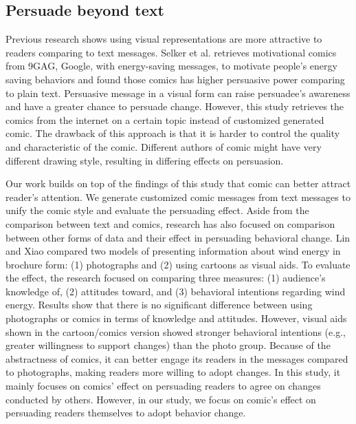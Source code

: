 \subsection{Persuade beyond text}
Previous research shows using visual representations are more attractive to readers comparing to text messages. Selker et al. retrieves motivational comics from 9GAG, Google, with energy-saving messages, to motivate people’s energy saving behaviors and found those comics has higher persuasive power comparing to plain text. Persuasive message in a visual form can raise persuadee’s awareness and have a greater chance to persuade change. However, this study retrieves the comics from the internet on a certain topic instead of customized generated comic. The drawback of this approach is that it is harder to control the quality and characteristic of the comic. Different authors of comic might have very different drawing style, resulting in differing effects on persuasion.\par
Our work builds on top of the findings of this study that comic can better attract reader's attention. We generate customized comic messages from text messages to unify the comic style and evaluate the persuading effect. Aside from the comparison between text and comics, research has also focused on comparison between other forms of data and their effect in persuading behavioral change. Lin and Xiao compared two models of presenting information about wind energy in brochure form: (1) photographs and (2) using cartoons as visual aids. To evaluate the effect, the research focused on comparing three measures: (1) audience's knowledge of, (2) attitudes toward, and (3) behavioral intentions regarding wind energy. Results show that there is no significant difference between using photographs or comics in terms of knowledge and attitudes. However, visual aids shown in the cartoon/comics version showed stronger behavioral intentions (e.g., greater willingness to support changes) than the photo group. Because of the abstractness of comics, it can better engage its readers in the messages compared to photographs, making readers more willing to adopt changes. In this study, it mainly focuses on comics' effect on persuading readers to agree on changes conducted by others. However, in our study, we focus on comic's effect on persuading readers themselves to adopt behavior change.\par




